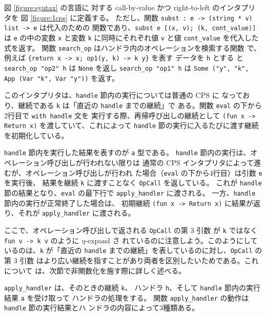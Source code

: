 図 \ref{figure:syntax} の言語に
対する call-by-value かつ right-to-left のインタプリタを
図 \ref{figure:1cps} に定義する。
ただし、関数 \texttt{subst :\ e -> (string * v) list -> e} は代入のための
関数であり、\texttt{subst e [(x, v); (k, cont\_value)]} は \texttt{e}
の中の変数 \texttt{x} と変数 \texttt{k} に同時にそれぞれ値 \texttt{v}
と値 \texttt{cont\_value} を代入した式を返す。
関数 \texttt{search\_op} はハンドラ内のオペレーションを検索する関数
で、例えば \texttt{\{return x -> x; op1(y, k) -> k y\}} を表す
データを \texttt{h} とする
と \texttt{search\_op "op2" h} は \texttt{None} を返し
\texttt{search\_op "op1" h} は \texttt{Some ("y", "k", App (Var "k", Var
"y"))} を返す。

このインタプリタは、\texttt{handle} 節内の実行については普通の CPS に
なっており、継続である \texttt{k} は「直近の \texttt{handle} までの継続」で
ある。関数 \texttt{eval} の下から2行目で \texttt{with handle} 文を
実行する際、再帰呼び出しの継続として
\texttt{(fun x -> Return x)} を渡していて、これによって
\texttt{handle} 節の実行に入るたびに渡す継続を初期化している。


\texttt{handle} 節内を実行した結果を表すのが \texttt{a} 型である。
\texttt{handle} 節内の実行は、オペレーション呼び出しが行われない限りは
通常の CPS インタプリタによって進むが、オペレーション呼び出しが行われ
た場合（\texttt{eval} の下から4行目）は引数 \texttt{e} を実行後、
結果を継続 \texttt{k} に渡すことなく \texttt{OpCall} を返している。
これが \texttt{handle} 節の結果となり、\texttt{eval} の最下行で
\texttt{apply\_handler} に渡される。
一方、\texttt{handle} 節内の実行が正常終了した場合は、
初期継続 \texttt{(fun x -> Return x)} に結果が返り、それが
\texttt{apply\_handler} に渡される。

ここで、オペレーション呼び出しで返される \texttt{OpCall} の第 3 引数
が \texttt{k} ではなく \texttt{fun v -> k v} のように $\eta$-expand さ
れているのに注意しよう。このようにしているのは、\texttt{k} が「直近の
\texttt{handle} までの継続」を表しているのに対し、\texttt{OpCall} の第 3 引数
はより広い継続を指すことがあり両者を区別したいためである。これについて
は、次節で非関数化を施す際に詳しく述べる。

\texttt{apply\_handler} は、そのときの継続 \texttt{k}、
ハンドラ \texttt{h}、そして
\texttt{handle} 節内の実行結果 \texttt{a} を受け取って
ハンドラの処理をする。
関数 \texttt{apply\_handler} の動作は \texttt{handle} 節の実行結果とハ
ンドラの内容によって3種類ある。

